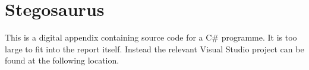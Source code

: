 \chapter{Stegosaurus}
\label{app:E}
This is a digital appendix containing source code for a C\# programme. It is too large to fit into the report itself.
Instead the relevant Visual Studio project can be found at the following location.

\setlength{\parindent}{0pt} {
 \\
}